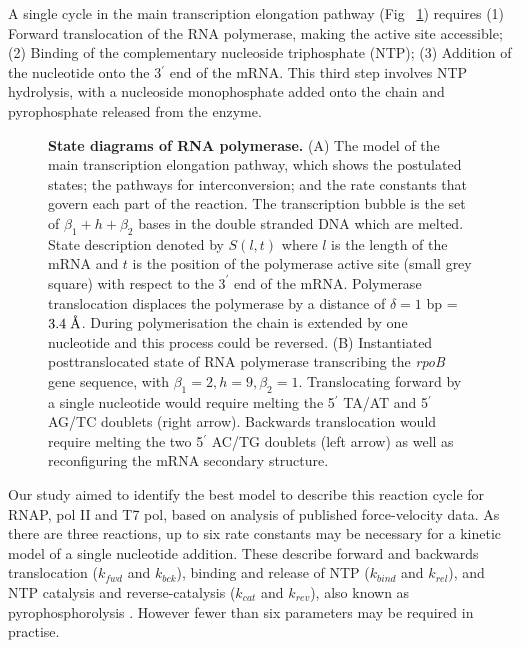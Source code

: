 \documentclass[10pt,letterpaper]{article}
\newcommand{\angstrom}{\mbox{\normalfont\AA}}
\begin{document}
A single cycle in the main transcription elongation pathway (Fig ~\ref{fig2}) requires (1) Forward translocation of the RNA polymerase, making the active site accessible; (2) Binding of the complementary nucleoside triphosphate (NTP); (3) Addition of the nucleotide onto the 3$^\prime$ end of the mRNA. This third step involves NTP hydrolysis, with a nucleoside monophosphate added onto the chain and pyrophosphate released from the enzyme.  \\

\begin{figure}[!h]
\caption{{\bf State diagrams of RNA polymerase.}
(A) The model of the main transcription elongation pathway, which shows the postulated states; the pathways for interconversion; and the rate constants that govern each part of the reaction. The transcription bubble is the set of $\beta_1 + h + \beta_2$ bases in the double stranded DNA which are melted. State description denoted by $S(l,t)$ where $l$ is the length of the mRNA and $t$ is the position of the polymerase active site (small grey square) with respect to the $3^\prime$ end of the mRNA.  Polymerase translocation displaces the polymerase by a distance of $\delta = 1$ bp = $3.4\; \angstrom$. During polymerisation the chain is extended by one nucleotide and this process could be reversed. (B) Instantiated posttranslocated state of RNA polymerase transcribing the \textit{rpoB} gene sequence, with $\beta_1 = 2, h = 9, \beta_2 = 1$. Translocating forward by a single nucleotide would require melting the 5$^\prime$ TA/AT and 5$^\prime$ AG/TC doublets (right arrow). Backwards translocation would require melting the two 5$^\prime$ AC/TG doublets (left arrow) as well as reconfiguring the mRNA secondary structure.}
\label{fig2}
\end{figure}




Our study aimed to identify the best model to describe this reaction cycle for RNAP, pol II and T7 pol, based on analysis of published force-velocity data. As there are three reactions, up to six rate constants may be necessary for a kinetic model of a single nucleotide addition. These describe forward and backwards translocation ($k_{fwd}$ and $k_{bck}$), binding and release of NTP ($k_{bind}$ and $k_{rel}$), and NTP catalysis and reverse-catalysis ($k_{cat}$ and $k_{rev}$), also known as pyrophosphorolysis \cite{maitra1967role}. However fewer than six parameters may be required in practise. \\
\end{document}

